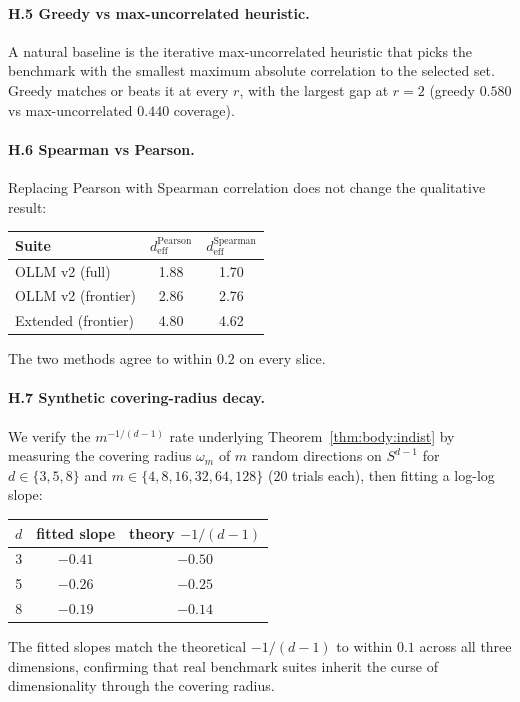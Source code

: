 \documentclass{article}
\begin{document}
\paragraph{H.5 Greedy vs max-uncorrelated heuristic.} A natural
baseline is the iterative max-uncorrelated heuristic that picks the
benchmark with the smallest maximum absolute correlation to the
selected set. Greedy matches or beats it at every $r$, with the
largest gap at $r = 2$ (greedy $0.580$ vs max-uncorrelated $0.440$
coverage).

\paragraph{H.6 Spearman vs Pearson.} Replacing Pearson with Spearman
correlation does not change the qualitative result:
\begin{center}\small
\begin{tabular}{lcc}
\toprule
Suite & $d_{\mathrm{eff}}^{\mathrm{Pearson}}$ & $d_{\mathrm{eff}}^{\mathrm{Spearman}}$ \\
\midrule
OLLM v2 (full)        & 1.88 & 1.70 \\
OLLM v2 (frontier)    & 2.86 & 2.76 \\
Extended (frontier)   & 4.80 & 4.62 \\
\bottomrule
\end{tabular}
\end{center}
The two methods agree to within $0.2$ on every slice.

\paragraph{H.7 Synthetic covering-radius decay.}
We verify the $m^{-1/(d-1)}$ rate underlying
Theorem~\ref{thm:body:indist} by measuring the covering radius
$\omega_m$ of $m$ random directions on $S^{d-1}$ for $d \in \{3, 5,
8\}$ and $m \in \{4, 8, 16, 32, 64, 128\}$ ($20$ trials each), then
fitting a log-log slope:
\begin{center}\small
\begin{tabular}{ccc}
\toprule
$d$ & fitted slope & theory $-1/(d-1)$ \\
\midrule
3 & $-0.41$ & $-0.50$ \\
5 & $-0.26$ & $-0.25$ \\
8 & $-0.19$ & $-0.14$ \\
\bottomrule
\end{tabular}
\end{center}
The fitted slopes match the theoretical $-1/(d-1)$ to within $0.1$
across all three dimensions, confirming that real benchmark suites
inherit the curse of dimensionality through the covering radius.
\end{document}
